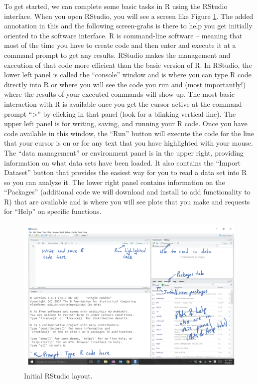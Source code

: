 \documentclass[]{book}
\renewcommand{\indent}{\hspace{15pt}}
\begin{document}
\indent To get started, we can complete some basic tasks in R using the RStudio
interface. When you open RStudio, you will see a screen like Figure
\ref{fig:Figure1-2}. The
added annotation in this and the following screen-grabs is there to help you
get initially oriented to the software interface. R is command-line software --
meaning that most of the time you have to create code and then enter and execute
it at a command prompt to get any results. RStudio makes the management and
execution of that code more efficient than the basic version of R. In RStudio,
the lower left panel is called the ``console'' window and is where you can type R
code directly into R or where you will see the code you run and (most
importantly!) where the results of your executed commands will show up. The
most basic interaction with R is available once you get the cursor active at
the command prompt ``\textgreater{}'' by clicking in that panel (look for a blinking
vertical line). The upper left panel is for writing, saving, and running your R
code. Once you have code available in this window, the ``Run'' button will
execute the code for the line that your cursor is on or for any text that you
have highlighted with your mouse. The ``data management'' or environment panel is
in the upper right, providing information on what data sets have been loaded.
It also contains the ``Import Dataset'' button that provides the easiest way for
you to read a data set into R so you can analyze it. The lower right panel
contains information on the ``Packages'' (additional code we will download and
install to add functionality to R) that are available and is where you will see
plots that you make and requests for ``Help'' on specific functions.



\begin{figure}[ht]
\includegraphics[width=13.67in]{chapter1_files/fig1.2} \caption{Initial RStudio layout.}\label{fig:Figure1-2}
\end{figure}
\end{document}
